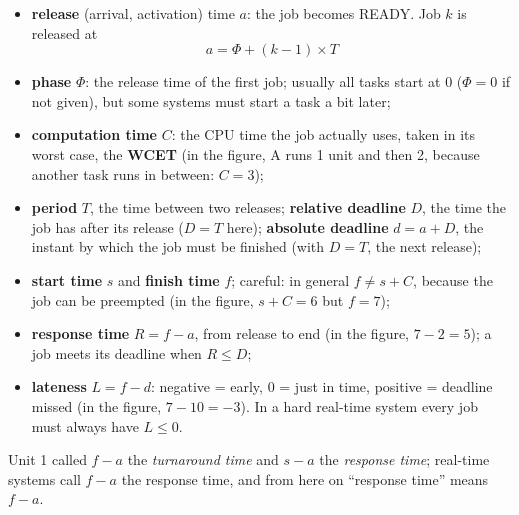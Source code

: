 \begin{itemize}
    \item \textbf{release} (arrival, activation) time $a$: the job becomes READY. Job $k$ is released at
    \[
    a = \Phi + (k-1) \times T
    \]
    \item \textbf{phase} $\Phi$: the release time of the first job; usually all tasks start at 0 ($\Phi = 0$ if not given), but some systems must start a task a bit later;
    \item \textbf{computation time} $C$: the CPU time the job actually uses, taken in its worst case, the \textbf{WCET} (in the figure, A runs 1 unit and then 2, because another task runs in between: $C = 3$);
    \item \textbf{period} $T$, the time between two releases; \textbf{relative deadline} $D$, the time the job has after its release ($D = T$ here); \textbf{absolute deadline} $d = a + D$, the instant by which the job must be finished (with $D = T$, the next release);
    \item \textbf{start time} $s$ and \textbf{finish time} $f$; careful: in general $f \neq s + C$, because the job can be preempted (in the figure, $s + C = 6$ but $f = 7$);
    \item \textbf{response time} $R = f - a$, from release to end (in the figure, $7 - 2 = 5$); a job meets its deadline when $R \le D$;
    \item \textbf{lateness} $L = f - d$: negative = early, 0 = just in time, positive = deadline missed (in the figure, $7 - 10 = -3$). In a hard real-time system every job must always have $L \le 0$.
\end{itemize}
Unit 1 called $f - a$ the \emph{turnaround time} and $s - a$ the \emph{response time}; real-time systems call $f - a$ the response time, and from here on ``response time'' means $f - a$.

